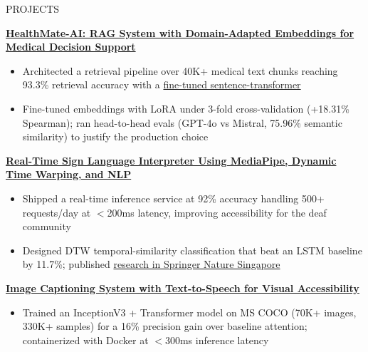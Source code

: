 \documentclass{resume}
\begin{document}
\begin{rSection}{\large PROJECTS}
\vspace{-1.8em}   %

\item \textbf{\href{https://github.com/yogvidwankhede/HealthMate-AI}{HealthMate-AI: RAG System with Domain-Adapted Embeddings for Medical Decision Support}}
\vspace{-0.5em}
\begin{itemize}[itemsep=1.5pt, topsep=2pt]
    \item Architected a retrieval pipeline over 40K+ medical text chunks reaching 93.3\% retrieval accuracy with a {\href{https://huggingface.co/yogvidwankhede/healthmate-minilm-l6-v2-medical-3fold}{fine-tuned sentence-transformer}}
    \item Fine-tuned embeddings with LoRA under 3-fold cross-validation (+18.31\% Spearman); ran head-to-head evals (GPT-4o vs Mistral, 75.96\% semantic similarity) to justify the production choice
\end{itemize}
\vspace{-0.21em}

\item \textbf{\href{https://github.com/yogvidwankhede/Sign_Language_Interpreter}{Real-Time Sign Language Interpreter Using MediaPipe, Dynamic Time Warping, and NLP}}
\vspace{-0.5em}
\begin{itemize}[itemsep=1.5pt, topsep=2pt]
    \item Shipped a real-time inference service at 92\% accuracy handling 500+ requests/day at $<$200ms latency, improving accessibility for the deaf community
    \item Designed DTW temporal-similarity classification that beat an LSTM baseline by 11.7\%; published {\href{https://link.springer.com/chapter/10.1007/978-981-97-1488-9_7}{research in Springer Nature Singapore}}
\end{itemize}
\vspace{-0.21em}

\item \textbf{\href{https://github.com/yogvidwankhede/Image-Captioning-System-Enhanced-with-a-TTS}{Image Captioning System with Text-to-Speech for Visual Accessibility}}
\vspace{-0.5em}
\begin{itemize}[itemsep=1.5pt, topsep=2pt]
    \item Trained an InceptionV3 + Transformer model on MS COCO (70K+ images, 330K+ samples) for a 16\% precision gain over baseline attention; containerized with Docker at $<$300ms inference latency
\end{itemize}
\vspace{-1em}
\end{rSection}
\end{document}
